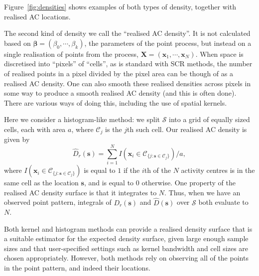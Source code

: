 \documentclass[useAMS,usenatbib,referee]{biom}
\begin{document}
Figure~\ref{fig:densities} shows examples of both types of density, together with realised AC locations.


The second kind of density we call the ``realised AC density''. It is not calculated based on $\bm{\beta} = (\beta_0, \cdots, \beta_k)$, the parameters of the point process, but instead on a single realisation of points from the process, $\bm{X} = (\bm{x}_1, \cdots, \bm{x}_N)$. When space is discretised into ``pixels'' of ``cells'', as is standard with SCR methods, the number of realised points in a pixel divided by the pixel area can be though of as a realised AC density. One can also smooth these realised densities across pixels in some way to produce a smooth realised AC density (and this is often done). There are various ways of doing this, including the use of spatial kernels.

Here we consider a histogram-like method: we split $\mathcal{S}$ into a grid of equally sized cells, each with area $a$, where $\mathcal{C}_j$ is the $j$th such cell. Our realised AC density is given by
\begin{equation}
\widehat{D}_r(\bm{s}) = \sum_{i = 1}^N I(\bm{x}_i \in \mathcal{C}_{\{j: \bm{s} \in \mathcal{C}_j\}})/a,
\end{equation}
where $I(\bm{x}_i \in \mathcal{C}_{\{j: \bm{s} \in \mathcal{C}_j\}})$ is equal to $1$ if the $i$th of the $N$ activity centres is in the same cell as the location $\bm{s}$, and is equal to $0$ otherwise. One property of the realised AC density surface is that it integrates to $N$. Thus, when we have an observed point pattern, integrals of $D_r(\bm{s})$ and $\widehat{D}(\bm{s})$ over $\mathcal{S}$ both evaluate to $N$.

Both kernel and histogram methods can provide a realised density surface that is a suitable estimator for the expected density surface, given large enough sample sizes and that user-specified settings such as kernel bandwidth and cell sizes are chosen appropriately. However, both methods rely on observing all of the points in the point pattern, and indeed their locations.
\end{document}
